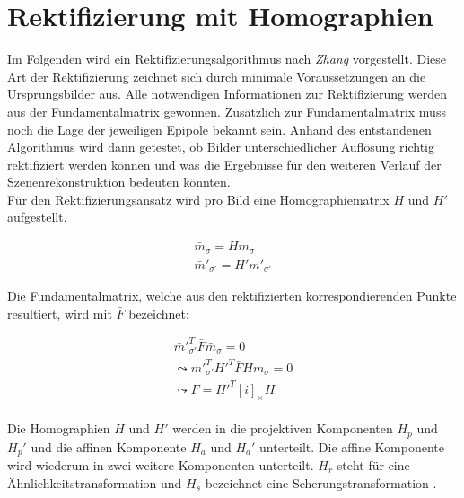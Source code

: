\section{Rektifizierung mit Homographien}
\label{sec:Rektifizierungsalg}

Im Folgenden wird ein Rektifizierungsalgorithmus nach \textit{Zhang}\cite{ZZ} vorgestellt. Diese Art der Rektifizierung zeichnet sich durch minimale Voraussetzungen an die Ursprungsbilder aus. Alle notwendigen Informationen zur Rektifizierung werden aus der Fundamentalmatrix gewonnen. Zusätzlich zur Fundamentalmatrix muss noch die Lage der jeweiligen Epipole bekannt sein\cite{phdextrinsicPara}. Anhand des entstandenen Algorithmus wird dann getestet, ob Bilder unterschiedlicher Auflösung richtig rektifiziert werden können und was die Ergebnisse für den weiteren Verlauf der Szenenrekonstruktion bedeuten könnten.\\

Für den Rektifizierungsansatz wird pro Bild eine Homographiematrix $H$ und $H'$ aufgestellt. 


\begin{gather}
	\bar{m}_\sigma= H m_\sigma\\ \label{eq:rectifyPoints}
	\bar{m}'_{\sigma'}= H'm'_{\sigma'}
\end{gather}


Die Fundamentalmatrix, welche aus den rektifizierten korrespondierenden Punkte resultiert, wird mit $\bar{F}$ bezeichnet\cite{ZZ,phdextrinsicPara}:


\begin{gather}
	\bar{m}'^T_{\sigma'}\bar{F}\bar{m}_\sigma = 0\\
	\leadsto m'^T_{\sigma'}H'^T\bar{F}Hm_\sigma=0\\	
	\leadsto F = H'^T[i]_\times H	
\end{gather}\\


Die Homographien $H$ und $H'$ werden in die projektiven Komponenten $H_p$ und $H_p'$ und die affinen Komponente $H_a$ und $H_a'$ unterteilt. Die affine Komponente wird wiederum in zwei weitere Komponenten unterteilt. $H_r$ steht für eine Ähnlichkeitstransformation und $H_s$ bezeichnet eine Scherungstransformation \cite{ZZ,phdextrinsicPara}.



